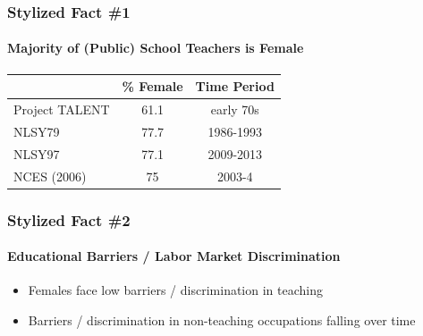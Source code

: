 \documentclass[11pt]{beamer}
\begin{document}
\begin{frame}
\frametitle{Stylized Fact \#1}
\framesubtitle{Majority of (Public) School Teachers is Female}
\begin{table}[h!]
  \centering 
  \begin{tabular}{l c c }
\toprule
 & \% Female & Time Period \\
 \midrule
 Project TALENT  &  61.1 & early 70s \\
 NLSY79  & 77.7 & 1986-1993 \\
 NLSY97  & 77.1 & 2009-2013 \\
\midrule
NCES (2006) & 75 & 2003-4\\
\bottomrule
\end{tabular}
\end{table}
\end{frame}

\begin{frame}
\frametitle{Stylized Fact \#2}
\framesubtitle{Educational Barriers / Labor Market Discrimination}
\begin{itemize}
  \item Females face low barriers / discrimination in teaching
  \item Barriers / discrimination in non-teaching occupations falling over time
\end{itemize}
\end{frame}
\end{document}
